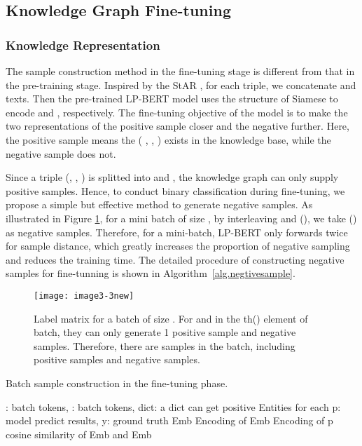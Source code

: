 \documentclass[journal]{IEEEtran}
\begin{document}
\subsection{Knowledge Graph Fine-tuning}

\subsubsection{Knowledge Representation}
The sample construction method in the fine-tuning stage is different from that in the pre-training stage. Inspired by the StAR \cite{wang2021structure}, for each triple, we concatenate  and  texts. Then the pre-trained LP-BERT model uses the structure of Siamese \cite{mueller2016siamese} to encode  and , respectively. The fine-tuning objective of the model is to make the two representations of the positive sample closer and the negative further. Here, the positive sample means the ( , , ) exists in the knowledge base, while the negative sample does not.

Since a triple (, , ) is splitted into  and , the knowledge graph can only supply positive samples. Hence, to conduct binary classification during fine-tuning, we propose a simple but effective method to generate negative samples. As illustrated in Figure \ref{fig:fig3}, for a mini batch of size , by interleaving  and  (), we take  () as negative samples. Therefore, for a mini-batch, LP-BERT only forwards twice for  sample distance, which greatly increases the proportion of negative sampling and reduces the training time. The detailed procedure of constructing negative samples for fine-tunning is shown in Algorithm~\ref{alg.negtivesample}.

\begin{figure}[!htbp]
\begin{minipage}[b]{1.0\linewidth}
		\centering
		\centerline{\texttt{[image: image3-3new]}}
\end{minipage}
	\caption{Label matrix for a batch of size . For  and  in the th() element of batch, they can only generate 1 positive sample and  negative samples. Therefore, there are  samples in the batch, including  positive samples and  negative samples.}
	\label{fig:fig3}
\end{figure}

\begin{algorithm}
\caption{Batch sample construction in the fine-tuning phase.}
	\label{alg.negtivesample}
	\begin{algorithmic}[1] 
		\Require :  batch tokens, :  batch tokens, dict: a dict can get positive Entities for each 
		\Ensure p: model predict results, y: ground truth
		\State Emb  Encoding of 
		\State Emb  Encoding of  
		\State p  cosine similarity of Emb and Emb
		
		\State 
		\For {}
		\For {}
		\State 
		\Else
		\State 
		\EndIf
		\EndFor
		\EndFor
		\State \Return{}
	\end{algorithmic}
\end{algorithm}
\end{document}
